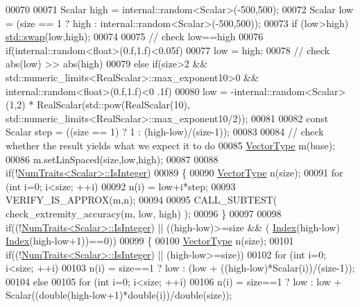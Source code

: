 \begin{DoxyCode}
00070   
00071   Scalar high = internal::random<Scalar>(-500,500);
00072   Scalar low = (size == 1 ? high : internal::random<Scalar>(-500,500));
00073   \textcolor{keywordflow}{if} (low>high) \hyperlink{endian_8c_a3ca5ecd34b04d6a243c054ac3a57f68d}{std::swap}(low,high);
00074 
00075   \textcolor{comment}{// check low==high}
00076   \textcolor{keywordflow}{if}(internal::random<float>(0.f,1.f)<0.05f)
00077     low = high;
00078   \textcolor{comment}{// check abs(low) >> abs(high)}
00079   \textcolor{keywordflow}{else} \textcolor{keywordflow}{if}(size>2 && std::numeric\_limits<RealScalar>::max\_exponent10>0 && internal::random<float>(0.f,1.f)<0
      .1f)
00080     low = -internal::random<Scalar>(1,2) * RealScalar(std::pow(RealScalar(10),
      std::numeric\_limits<RealScalar>::max\_exponent10/2));
00081 
00082   \textcolor{keyword}{const} Scalar step = ((size == 1) ? 1 : (high-low)/(size-1));
00083 
00084   \textcolor{comment}{// check whether the result yields what we expect it to do}
00085   \hyperlink{struct_vector_type}{VectorType} m(base);
00086   m.setLinSpaced(size,low,high);
00087 
00088   \textcolor{keywordflow}{if}(!\hyperlink{group___core___module_struct_eigen_1_1_num_traits}{NumTraits<Scalar>::IsInteger})
00089   \{
00090     \hyperlink{struct_vector_type}{VectorType} n(size);
00091     \textcolor{keywordflow}{for} (\textcolor{keywordtype}{int} i=0; i<size; ++i)
00092       n(i) = low+i*step;
00093     VERIFY\_IS\_APPROX(m,n);
00094 
00095     CALL\_SUBTEST( check\_extremity\_accuracy(m, low, high) );
00096   \}
00097 
00098   \textcolor{keywordflow}{if}((!\hyperlink{group___core___module_struct_eigen_1_1_num_traits}{NumTraits<Scalar>::IsInteger}) || ((high-low)>=size && (
      \hyperlink{namespace_eigen_a62e77e0933482dafde8fe197d9a2cfde}{Index}(high-low)%
      \hyperlink{namespace_eigen_a62e77e0933482dafde8fe197d9a2cfde}{Index}(high-low+1))==0))
00099   \{
00100     \hyperlink{struct_vector_type}{VectorType} n(size);
00101     \textcolor{keywordflow}{if}((!\hyperlink{group___core___module_struct_eigen_1_1_num_traits}{NumTraits<Scalar>::IsInteger}) || (high-low>=size))
00102       \textcolor{keywordflow}{for} (\textcolor{keywordtype}{int} i=0; i<size; ++i)
00103         n(i) = size==1 ? low : (low + ((high-low)*Scalar(i))/(size-1));
00104     \textcolor{keywordflow}{else}
00105       \textcolor{keywordflow}{for} (\textcolor{keywordtype}{int} i=0; i<size; ++i)
00106         n(i) = size==1 ? low : low + Scalar((\textcolor{keywordtype}{double}(high-low+1)*\textcolor{keywordtype}{double}(i))/\textcolor{keywordtype}{double}(size));

\end{DoxyCode}

